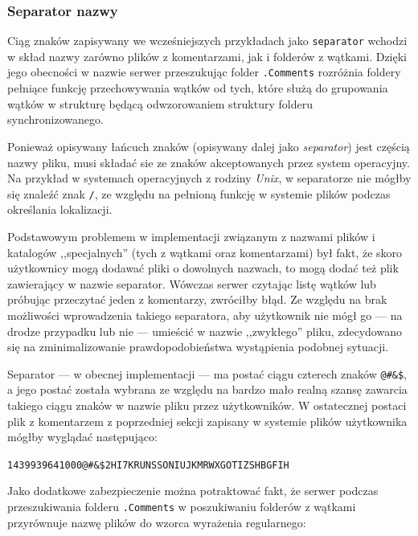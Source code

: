 \subsubsection*{Separator nazwy}

\label{filenames}

Ciąg znaków zapisywany we wcześniejszych przykładach jako \texttt{separator} wchodzi w skład nazwy zarówno plików z komentarzami, jak i folderów z wątkami. Dzięki jego obecności w nazwie serwer przeszukując folder \texttt{.Comments} rozróżnia foldery pełniące funkcję przechowywania wątków od tych, które służą do grupowania wątków w strukturę będącą odwzorowaniem struktury folderu synchronizowanego.

Ponieważ opisywany łańcuch znaków (opisywany dalej jako \emph{separator}) jest częścią nazwy pliku, musi składać sie ze znaków akceptowanych przez system operacyjny. Na przykład w systemach operacyjnych z rodziny \emph{Unix}, w separatorze nie mógłby się znaleźć znak \texttt{/}, ze względu na pełnioną funkcję w systemie plików podczas określania lokalizacji.

Podstawowym problemem w implementacji związanym z nazwami plików i katalogów ,,specjalnych'' (tych z wątkami oraz komentarzami) był fakt, że skoro użytkownicy mogą dodawać pliki o dowolnych nazwach, to mogą dodać też plik zawierający w nazwie separator. Wówczas serwer czytając listę wątków lub próbując przeczytać jeden z komentarzy, zwróciłby błąd. Ze względu na brak możliwości wprowadzenia takiego separatora, aby użytkownik nie mógł go --- na drodze przypadku lub nie --- umieścić w nazwie ,,zwykłego'' pliku, zdecydowano się na zminimalizowanie prawdopodobieństwa wystąpienia podobnej sytuacji.

Separator --- w obecnej implementacji --- ma postać ciągu czterech znaków \texttt{@\#\&\$}, a jego postać została wybrana ze względu na bardzo mało realną szansę zawarcia takiego ciągu znaków w nazwie pliku przez użytkowników. W ostatecznej postaci plik z komentarzem z poprzedniej sekcji zapisany w systemie plików użytkownika mógłby wyglądać następująco:

\begin{center}
  \texttt{1439939641000@\#\&\$2HI7KRUNSSONIUJKMRWXGOTIZSHBGFIH}
\end{center}

Jako dodatkowe zabezpieczenie można potraktować fakt, że serwer podczas przeszukiwania folderu \texttt{.Comments} w poszukiwaniu folderów z wątkami przyrównuje nazwę plików do wzorca wyrażenia regularnego:

